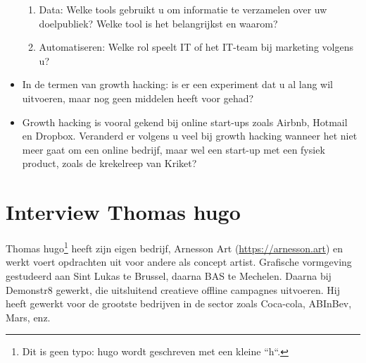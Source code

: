 \begin{itemize}
\begin{enumerate}[label*=\arabic*.]
		
		
		\item Data: Welke tools gebruikt u om informatie te verzamelen over uw doelpubliek? Welke tool is het belangrijkst en waarom?
		
		
		
		\item Automatiseren: Welke rol speelt IT of het IT-team bij marketing volgens u? 
		
		
		
	\end{enumerate}
	\item In de termen van growth hacking: is er een experiment dat u al lang wil uitvoeren, maar nog geen middelen heeft voor gehad?
	
	
	
	\item Growth hacking is vooral gekend bij online start-ups zoals Airbnb, Hotmail en Dropbox. Veranderd er volgens u veel bij growth hacking wanneer het niet meer gaat om een online bedrijf, maar wel een start-up met een fysiek product, zoals de krekelreep van Kriket?
	
	
	
\end{itemize}


\section{Interview Thomas hugo}
\label{sec:interview-thomas-hugo}

Thomas hugo\footnote{Dit is geen typo: hugo wordt geschreven met een kleine ``h``. } heeft zijn eigen bedrijf, Arnesson Art (\href{https://arnesson.art/}{https://arnesson.art}) en werkt voert opdrachten uit voor andere als concept artist. Grafische vormgeving gestudeerd aan Sint Lukas te Brussel, daarna BAS te Mechelen. Daarna bij Demonstr8 gewerkt, die uitsluitend creatieve offline campagnes uitvoeren. Hij heeft gewerkt voor de grootste bedrijven in de sector zoals Coca-cola, ABInBev, Mars, enz.

